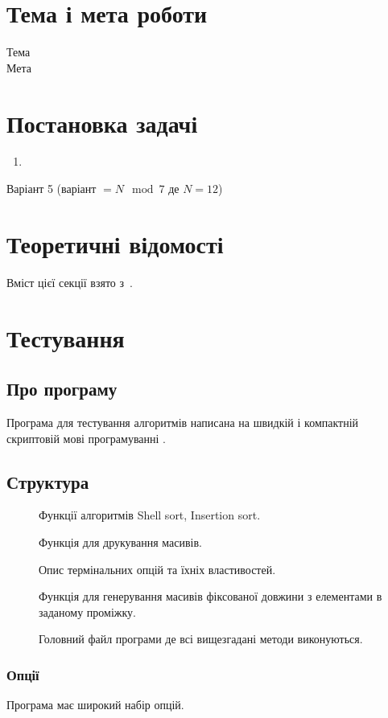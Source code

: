 \documentclass[../../../../document]{subfiles}
\begin{document}
	\nocite{*}

	\chapter{Тема і мета роботи}
	 Тема\\
	 Мета
	\chapter{Постановка задачі}
	\begin{enumerate}
		\item
	\end{enumerate}
	Варіант 5 (варіант \(=N\mod7\) де \(N=12\))

	\chapter{Теоретичні відомості}
	Вміст цієї секції взято з~\cite{Karumanchi_2020}.

	\chapter{Тестування}
	\section{Про програму}
	Програма для тестування алгоритмів написана на швидкій і компактній скриптовій мові
	програмуванні .
	\section{Структура}
	\begin{description}
		\item[] Функції алгоритмів Shell sort, Insertion sort.
		\item[] Функція для друкування масивів.
		\item[] Опис термінальних опцій та їхніх властивостей.
		\item[] Функція для генерування масивів фіксованої довжини з елементами в заданому проміжку.
		\item[] Головний файл програми де всі вищезгадані методи виконуються.
	\end{description}
	\subsection{Опції}
	Програма має широкий набір опцій.
\end{document}
